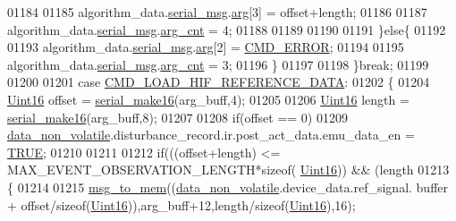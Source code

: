 \begin{DoxyCode}
{{{{{01184 
01185                          algorithm\_data.\hyperlink{a00016_afcf5f557aea688aad985eec15269c1da}{serial\_msg}.\hyperlink{a00031_af7d6f762438c80072bd9dc0e4dd4ae1e}{arg}[3] = offset+length;
01186 
01187                          algorithm\_data.\hyperlink{a00016_afcf5f557aea688aad985eec15269c1da}{serial\_msg}.\hyperlink{a00031_a7b79f40e2eeec288091afd340bf8f591}{arg\_cnt} = 4;
01188                          
01189                    
01190 
01191                      \}\textcolor{keywordflow}{else}\{
01192 
01193                          algorithm\_data.\hyperlink{a00016_afcf5f557aea688aad985eec15269c1da}{serial\_msg}.\hyperlink{a00031_af7d6f762438c80072bd9dc0e4dd4ae1e}{arg}[2] = 
      \hyperlink{a00021_a1764a522e9c1a59a59be8757c69fa494}{CMD\_ERROR};
01194 
01195                          algorithm\_data.\hyperlink{a00016_afcf5f557aea688aad985eec15269c1da}{serial\_msg}.\hyperlink{a00031_a7b79f40e2eeec288091afd340bf8f591}{arg\_cnt} = 3;
01196                      \}
01197 
01198                 \}\textcolor{keywordflow}{break};
01199 
01200 
01201                 \textcolor{keywordflow}{case}  \hyperlink{a00021_afc4f83cb04e57ee185a039b10e19e297}{CMD\_LOAD\_HIF\_REFERENCE\_DATA}:
01202                 \{
01204                     \hyperlink{a00072_a59a9f6be4562c327cbfb4f7e8e18f08b}{Uint16} offset = \hyperlink{a00031_abc17de32f14103a5be219df0d4ad9176}{serial\_make16}(arg\_buff,4);
01205 
01206                     \hyperlink{a00072_a59a9f6be4562c327cbfb4f7e8e18f08b}{Uint16} length = \hyperlink{a00031_abc17de32f14103a5be219df0d4ad9176}{serial\_make16}(arg\_buff,8);
01207 
01208                     \textcolor{keywordflow}{if}(offset == 0)
01209                         \hyperlink{a00060_a76ac5f917f5308dcd83de0d7c94559fb}{data\_non\_volatile}.disturbance\_record.ir.post\_act\_data.emu\_data\_en 
      = \hyperlink{a00040_aa8cecfc5c5c054d2875c03e77b7be15d}{TRUE};
01210 
01211 
01212                      \textcolor{keywordflow}{if}(((offset+length) <= MAX\_EVENT\_OBSERVATION\_LENGTH*\textcolor{keyword}{sizeof}(
      \hyperlink{a00072_a59a9f6be4562c327cbfb4f7e8e18f08b}{Uint16})) && (length%
01213                       \{
01214 
01215                          \hyperlink{a00038_a126f3d78a95341a19a3e862e57357952}{msg\_to\_mem}((\hyperlink{a00060_a76ac5f917f5308dcd83de0d7c94559fb}{data\_non\_volatile}.device\_data.ref\_signal.
      buffer + offset/\textcolor{keyword}{sizeof}(\hyperlink{a00072_a59a9f6be4562c327cbfb4f7e8e18f08b}{Uint16})),arg\_buff+12,length/\textcolor{keyword}{sizeof}(\hyperlink{a00072_a59a9f6be4562c327cbfb4f7e8e18f08b}{Uint16}),16);
}}}}}
\end{DoxyCode}
